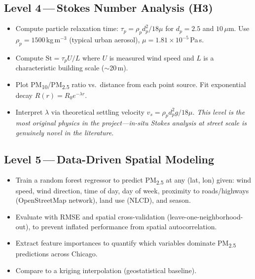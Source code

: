 \documentclass[11pt, letterpaper]{article}
\begin{document}
\subsection{Level 4\,---\,Stokes Number Analysis (H3)}
\begin{itemize}
  \item Compute particle relaxation time: $\tau_p = \rho_p d_p^2 / 18\mu$ for $d_p = 2.5$ and $10\,\mu$m. Use $\rho_p = 1500$\,kg\,m$^{-3}$ (typical urban aerosol), $\mu = 1.81\times10^{-5}$\,Pa\,s.
  \item Compute $\mathrm{St} = \tau_p U / L$ where $U$ is measured wind speed and $L$ is a characteristic building scale ($\sim$20\,m).
  \item Plot PM\textsubscript{10}/PM\textsubscript{2.5} ratio vs.\ distance from each point source. Fit exponential decay $R(r) = R_0 e^{-\lambda r}$.
  \item Interpret $\lambda$ via theoretical settling velocity $v_s = \rho_p d_p^2 g / 18\mu$. \textit{This level is the most original physics in the project---in-situ Stokes analysis at street scale is genuinely novel in the literature.}
\end{itemize}

\subsection{Level 5\,---\,Data-Driven Spatial Modeling}
\begin{itemize}
  \item Train a random forest regressor to predict PM\textsubscript{2.5} at any (lat, lon) given: wind speed, wind direction, time of day, day of week, proximity to roads/highways (OpenStreetMap network), land use (NLCD), and season.
  \item Evaluate with RMSE and spatial cross-validation (leave-one-neighborhood-out), to prevent inflated performance from spatial autocorrelation.
  \item Extract feature importances to quantify which variables dominate PM\textsubscript{2.5} predictions across Chicago.
  \item Compare to a kriging interpolation (geostatistical baseline).
\end{itemize}

\end{document}
